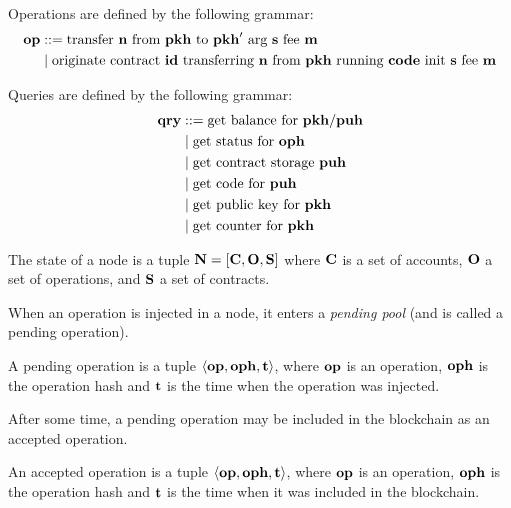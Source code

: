 \documentclass[a4paper]{llncs}
\begin{document}
\begin{definition}[Operation]
  Operations are defined by the following grammar:
  \begin{align*}
    \OP &::= \TRANSFER[\STRING]\NTEZ\PKH{\PKH'}\MTEZ
    \\&\mid \ORIGINATE\ID\NTEZ\PKH\CODE\STRING\MTEZ
  \end{align*}
\end{definition}

\begin{definition}[Query]
Queries are defined by the following grammar:
\begin{align*}
  \QRY & ::= \GETBALANCE {\PKH / \PUH}
  \\&\mid \GETSTATUS\OPH
  \\&\mid \GETSTORAGE\PUH
  \\&\mid \GETCODE\PUH 
  \\&\mid \GETPUBLICKEY\PKH
  \\&\mid \GETCOUNTER\PKH
\end{align*}


\end{definition}
 \begin{definition}
   The state of a node is a tuple
   $\NODE = [\ACCOUNTS, \OPERATIONS, \CONTRACTS]$ where $\ACCOUNTS$ is a set of accounts,
   $\OPERATIONS$ a set of operations, and $\CONTRACTS$  a set of contracts. 
\end{definition}

When an operation is injected in a node, it enters a \emph{pending pool}
(and is called a pending operation). 
 \begin{definition}
A pending operation is a tuple  $\langle  \OP, \OPH, \TIME
\rangle $, where $\OP$ is an operation, $\OPH$ is the operation hash
and $\TIME$ is the time when the operation was injected. 
\end{definition}
After some time, a pending operation may be included in the blockchain as an accepted operation.
 \begin{definition}
An accepted operation  is a tuple $\langle  \OP, \OPH, \TIME \rangle
$, where $\OP$ is an operation, $\OPH$ is the operation hash and
$\TIME$ is the time when it was included in the blockchain. 
\end{definition}
\end{document}
